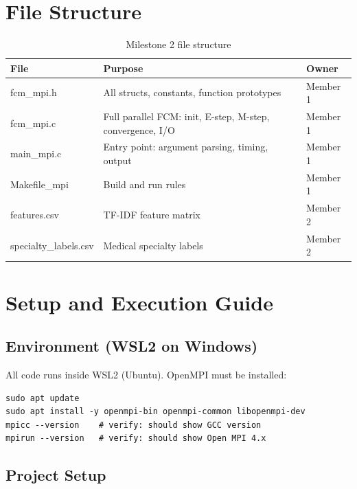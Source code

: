 \documentclass[12pt,a4paper]{article}
\begin{document}
\section{File Structure}

\begin{table}[H]
\centering
\begin{tabularx}{\textwidth}{>{\ttfamily}l X l}
\toprule
\textbf{File} & \textbf{Purpose} & \textbf{Owner} \\
\midrule
fcm\_mpi.h    & All structs, constants, function prototypes & Member 1 \\
fcm\_mpi.c    & Full parallel FCM: init, E-step, M-step, convergence, I/O & Member 1 \\
main\_mpi.c   & Entry point: argument parsing, timing, output & Member 1 \\
Makefile\_mpi & Build and run rules & Member 1 \\
features.csv          & TF-IDF feature matrix & Member 2 \\
specialty\_labels.csv & Medical specialty labels & Member 2 \\
\bottomrule
\end{tabularx}
\caption{Milestone 2 file structure}
\end{table}

\section{Setup and Execution Guide}

\subsection{Environment (WSL2 on Windows)}

All code runs inside WSL2 (Ubuntu). OpenMPI must be installed:

\begin{lstlisting}[style=bashstyle, caption={Install OpenMPI in WSL2}]
sudo apt update
sudo apt install -y openmpi-bin openmpi-common libopenmpi-dev
mpicc --version    # verify: should show GCC version
mpirun --version   # verify: should show Open MPI 4.x
\end{lstlisting}

\subsection{Project Setup}
\end{document}
